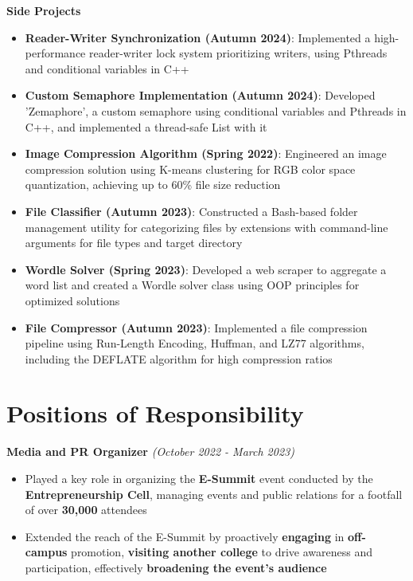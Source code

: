 \documentclass[11pt,letterpaper,sans]{moderncv}
\begin{document}
\vspace{\projectspacing}
\noindent \textbf{\large Side Projects}
\begin{itemize}[noitemsep, topsep=0pt, leftmargin=*]
\setlength\itemsep{\subpointspacing}

\item \textbf{Reader-Writer Synchronization (Autumn 2024)}: Implemented a high-performance reader-writer lock system prioritizing writers, using Pthreads and conditional variables in C++
\item \textbf{Custom Semaphore Implementation (Autumn 2024)}: Developed 'Zemaphore', a custom semaphore using conditional variables and Pthreads in C++, and implemented a thread-safe List with it
\item \textbf{Image Compression Algorithm (Spring 2022)}: Engineered an image compression solution using K-means clustering for RGB color space quantization, achieving up to 60\% file size reduction
\item \textbf{File Classifier (Autumn 2023)}: Constructed a Bash-based folder management utility for categorizing files by extensions with command-line arguments for file types and target directory
\item \textbf{Wordle Solver (Spring 2023)}: Developed a web scraper to aggregate a word list and created a Wordle solver class using OOP principles for optimized solutions
\item \textbf{File Compressor (Autumn 2023)}: Implemented a file compression pipeline using Run-Length Encoding, Huffman, and LZ77 algorithms, including the DEFLATE algorithm for high compression ratios
\end{itemize}

\vspace{-10pt}

\section{\LARGE Positions of Responsibility}
\vspace{-4pt}
\noindent \textbf{\large Media and PR Organizer} \hfill{\sl \small (October 2022 - March 2023)}\
\begin{itemize}[noitemsep, topsep=0pt, leftmargin=*]
\setlength\itemsep{\subpointspacing}
\item Played a key role in organizing the \textbf{E-Summit} event conducted by the \textbf{Entrepreneurship Cell}, managing events and public relations for a footfall of over \textbf{30,000 }attendees
\item Extended the reach of the E-Summit by proactively \textbf{engaging} in \textbf{off-campus} promotion, \textbf{visiting another college} to drive awareness and participation, effectively \textbf{broadening the event’s audience}
\end{itemize}
\end{document}
